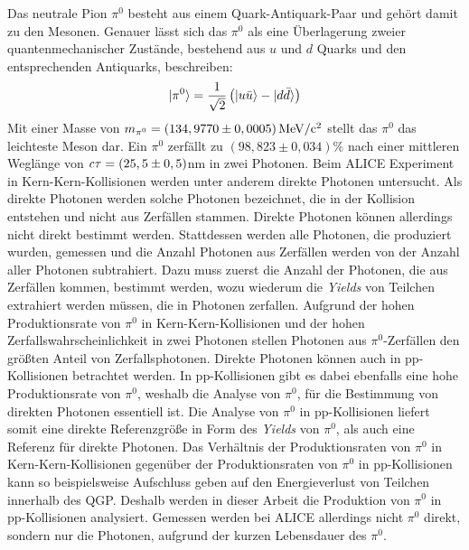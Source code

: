 Das neutrale Pion $\pi^{0}$ besteht aus einem Quark-Antiquark-Paar und gehört damit zu den Mesonen.
Genauer lässt sich das $\pi^{0}$ als eine Überlagerung zweier quantenmechanischer Zustände, bestehend aus $u$ und $d$ Quarks und den entsprechenden Antiquarks, beschreiben:
\begin{align}
\lvert\pi^{0}\rangle = \frac{1}{\sqrt{2}}\left(\lvert u\bar{u}\rangle-\lvert d\bar{d}\rangle\right) \label{eq:pi0state}
\end{align}
Mit einer Masse von $m_{\pi^{0}} = \left(134,9770\pm0,0005\right) \rm{MeV}/c^{2}$ \cite{book:pdg} stellt das $\pi^{0}$ das leichteste Meson dar.
Ein ${\pi^{0}}$ zerf{ä}llt zu $\left( 98,823\pm0,034\right)\%$ nach einer mittleren Weglänge von ${\it c\tau} = (25,5\pm0,5)$nm \cite{book:pdg} in zwei Photonen.
\newline
Beim ALICE Experiment in Kern-Kern-Kollisionen werden unter anderem direkte Photonen untersucht.
Als direkte Photonen werden solche Photonen bezeichnet, die in der Kollision entstehen und nicht aus Zerfällen stammen.
Direkte Photonen können allerdings nicht direkt bestimmt werden.
Stattdessen werden alle Photonen, die produziert wurden, gemessen und die Anzahl Photonen aus Zerfällen werden von der Anzahl aller Photonen subtrahiert.
Dazu muss zuerst die Anzahl der Photonen, die aus Zerfällen kommen, bestimmt werden, wozu wiederum die \textit{Yields} von Teilchen extrahiert werden müssen, die in Photonen zerfallen.
Aufgrund der hohen Produktionsrate von $\pi^{0}$ in Kern-Kern-Kollisionen und der hohen Zerfallswahrscheinlichkeit in zwei Photonen stellen Photonen aus $\pi^{0}$-Zerfällen den größten Anteil von Zerfallsphotonen.
\newline
Direkte Photonen können auch in pp-Kollisionen betrachtet werden.
In pp-Kollisionen gibt es dabei ebenfalls eine hohe Produktionsrate von $\pi^{0}$, weshalb die Analyse von $\pi^{0}$, für die Bestimmung von direkten Photonen essentiell ist.
Die Analyse von $\pi^{0}$ in pp-Kollisionen liefert somit eine direkte Referenzgröße in Form des \textit{Yields} von $\pi^{0}$, als auch eine Referenz für direkte Photonen.
Das Verhältnis der Produktionsraten von $\pi^{0}$ in Kern-Kern-Kollisionen gegenüber der Produktionsraten von $\pi^{0}$ in pp-Kollisionen kann so beispielsweise Aufschluss geben auf den Energieverlust von Teilchen innerhalb des QGP.
Deshalb werden in dieser Arbeit die Produktion von $\pi^{0}$ in pp-Kollisionen analysiert.
\newline
Gemessen werden bei ALICE allerdings nicht $\pi^{0}$ direkt, sondern nur die Photonen, aufgrund der kurzen Lebensdauer des $\pi^{0}$.
